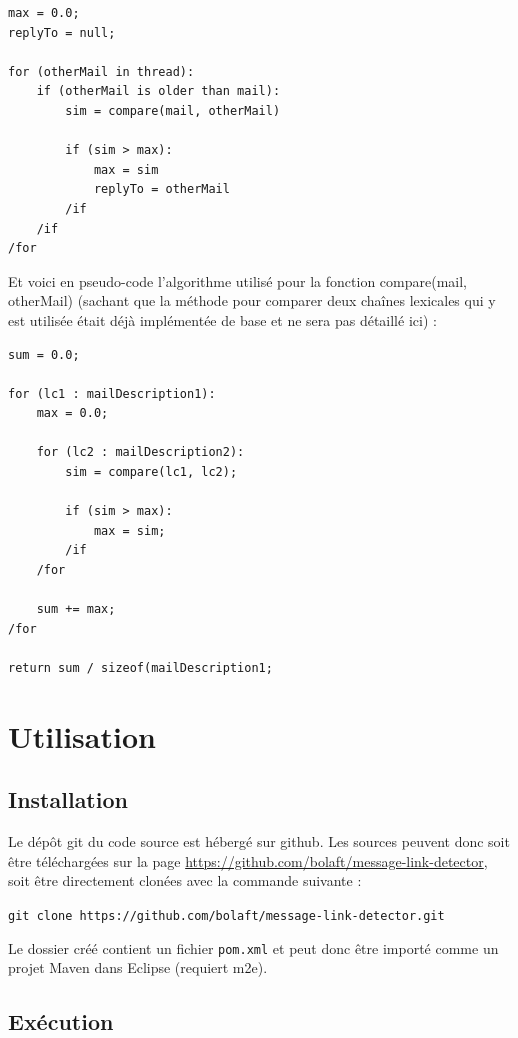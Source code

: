 \documentclass[a4paper]{article}
\begin{document}
\begin{lstlisting}
max = 0.0;
replyTo = null;

for (otherMail in thread):
	if (otherMail is older than mail):
		sim = compare(mail, otherMail)
		
		if (sim > max):
			max = sim
			replyTo = otherMail
		/if
	/if
/for
\end{lstlisting}

Et voici en pseudo-code l'algorithme utilisé pour la fonction compare(mail, otherMail) (sachant que la méthode pour comparer deux chaînes lexicales qui y est utilisée était déjà implémentée de base et ne sera pas détaillé ici) :

\begin{lstlisting}
sum = 0.0;

for (lc1 : mailDescription1):
	max = 0.0;
	
	for (lc2 : mailDescription2):
		sim = compare(lc1, lc2);
		
		if (sim > max):
			max = sim;
		/if
	/for
	
	sum += max;
/for

return sum / sizeof(mailDescription1;
\end{lstlisting}

\section{Utilisation}

\subsection{Installation}

Le dépôt git du code source est hébergé sur github. Les sources peuvent donc soit être téléchargées sur la page \url{https://github.com/bolaft/message-link-detector}, soit être directement clonées avec la commande suivante :\newline

\texttt{git clone https://github.com/bolaft/message-link-detector.git}\newline

Le dossier créé contient un fichier \texttt{pom.xml} et peut donc être importé comme un projet Maven dans Eclipse (requiert m2e).

\subsection{Exécution}
\end{document}
